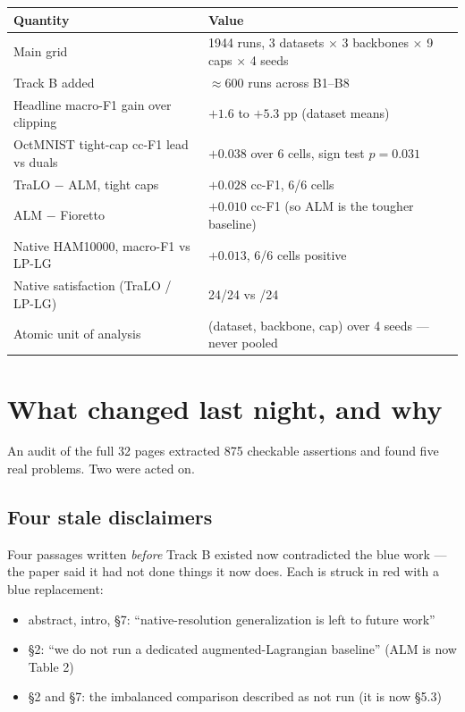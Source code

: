 \documentclass[11pt,a4paper]{article}
\begin{document}
\begin{center}\small
\begin{tabular}{p{6.6cm}l}
\toprule
Quantity & Value \\
\midrule
Main grid & 1944 runs, 3 datasets $\times$ 3 backbones $\times$ 9 caps $\times$ 4 seeds \\
Track B added & $\approx$600 runs across B1--B8 \\
Headline macro-F1 gain over clipping & $+1.6$ to $+5.3$ pp (dataset means) \\
OctMNIST tight-cap cc-F1 lead vs duals & $+0.038$ over 6 cells, sign test $p{=}0.031$ \\
TraLO $-$ ALM, tight caps & $+0.028$ cc-F1, 6/6 cells \\
ALM $-$ Fioretto & $+0.010$ cc-F1 (so ALM is the tougher baseline) \\
Native HAM10000, macro-F1 vs LP-LG & $+0.013$, 6/6 cells positive \\
Native satisfaction (TraLO / LP-LG) & 24/24 \; vs \; 0/24 \\
Atomic unit of analysis & (dataset, backbone, cap) over 4 seeds --- never pooled \\
\bottomrule
\end{tabular}
\end{center}

\section{What changed last night, and why}

An audit of the full 32 pages extracted 875 checkable assertions and found five real
problems. Two were acted on.

\subsection{Four stale disclaimers}
Four passages written \emph{before} Track B existed now contradicted the blue work --- the
paper said it had not done things it now does. Each is struck in red with a blue
replacement:

\begin{itemize}
\item abstract, intro, \S7: ``native-resolution generalization is left to future work''
\item \S2: ``we do not run a dedicated augmented-Lagrangian baseline'' (ALM is now Table 2)
\item \S2 and \S7: the imbalanced comparison described as not run (it is now \S5.3)
\end{itemize}
\end{document}
